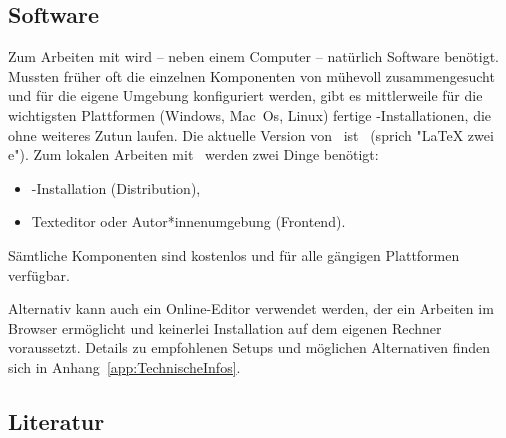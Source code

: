 \subsection{Software}
\label{sec:Software}

Zum Arbeiten mit \latex wird -- neben einem Computer -- natürlich Software
benötigt. Mussten früher oft die einzelnen Komponenten von \latex mühevoll
zusammengesucht und für die eigene Umgebung konfiguriert werden, gibt es
mittlerweile für die wichtigsten Plattformen (Windows, Mac~Os, Linux) fertige
\latex-Installationen, die ohne weiteres Zutun laufen. Die aktuelle Version von
\latex\ ist \LaTeXe\ (sprich "LaTeX zwei e"). Zum lokalen Arbeiten mit \latex\
werden zwei Dinge benötigt:
%
\begin{itemize}
\item \latex-Installation (Distribution),
\item Texteditor oder Autor*innenumgebung (Frontend).
\end{itemize}
%
Sämtliche Komponenten sind kostenlos und für alle gängigen Plattformen verfügbar.

Alternativ kann auch ein Online-Editor verwendet werden, der ein Arbeiten im
Browser ermöglicht und keinerlei Installation auf dem eigenen Rechner
voraussetzt. Details zu empfohlenen Setups und möglichen Alternativen finden
sich in Anhang~\ref{app:TechnischeInfos}.


\subsection{Literatur}
\label{sec:literatur}

